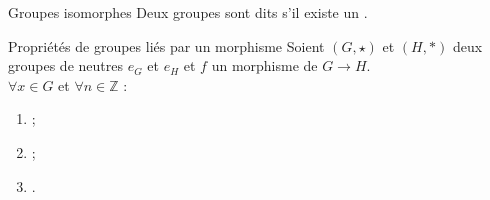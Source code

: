 \documentclass[12pt,a4paper]{report}
\begin{document}
    \begin{definition}{Groupes isomorphes}{}
    Deux groupes sont dits  s'il existe un .
    \end{definition}
    
    \begin{propositions}{Propriétés de groupes liés par un morphisme}{}
     Soient $(G, \star)$ et $(H, \ast)$ deux groupes de neutres $e_G$ et $e_H$ et $f$ un morphisme de $G \rightarrow H$.\\
     $\forall x \in G$ et $\forall n \in \mathbb{Z}$ :
    \begin{multicols}{3}
    \begin{enumerate}[label=\bfseries\arabic*)]
        \item\label{PorpGrpIsmrph1}  ;
        \item\label{PorpGrpIsmrph2}  ;
        \item\label{PorpGrpIsmrph3} .
    \end{enumerate}
    \end{multicols}
    \end{propositions}
    
\end{document}
